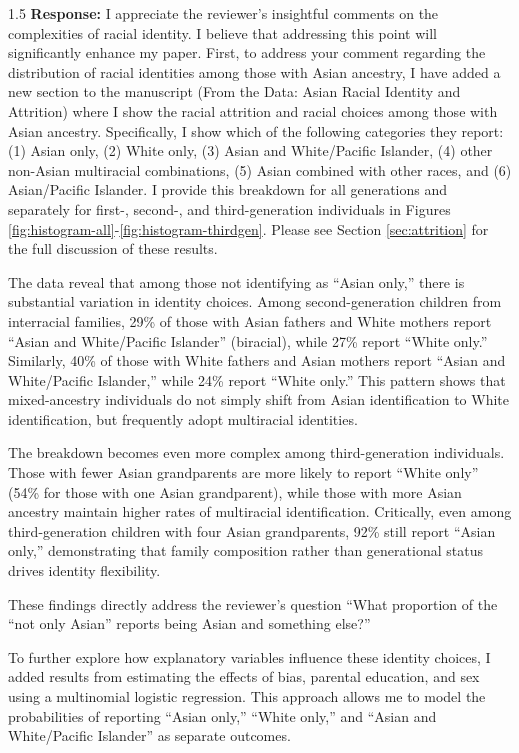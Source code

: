 \documentclass[12pt,english]{article}
\newcommand{\rrxspc}{1.5}
\begin{document}
\begin{refsection}
        \begin{spacing}{\rrxspc}
            \textbf{Response:} I appreciate the reviewer's insightful comments on the complexities of racial identity. I believe that addressing this point will significantly enhance my paper. First, to address your comment regarding the distribution of racial identities among those with Asian ancestry, I have added a new section to the manuscript (From the Data: Asian Racial Identity and Attrition) where I show the racial attrition and racial choices among those with Asian ancestry. Specifically, I show which of the following categories they report: (1) Asian only, (2) White only, (3) Asian and White/Pacific Islander, (4) other non-Asian multiracial combinations, (5) Asian combined with other races, and (6) Asian/Pacific Islander. I provide this breakdown for all generations and separately for first-, second-, and third-generation individuals in Figures \ref{fig:histogram-all}-\ref{fig:histogram-thirdgen}. Please see Section \ref{sec:attrition} for the full discussion of these results. 

            The data reveal that among those not identifying as ``Asian only,'' there is substantial variation in identity choices. Among second-generation children from interracial families, 29\% of those with Asian fathers and White mothers report ``Asian and White/Pacific Islander'' (biracial), while 27\% report ``White only.'' Similarly, 40\% of those with White fathers and Asian mothers report ``Asian and White/Pacific Islander,'' while 24\% report ``White only.'' This pattern shows that mixed-ancestry individuals do not simply shift from Asian identification to White identification, but frequently adopt multiracial identities.

            The breakdown becomes even more complex among third-generation individuals. Those with fewer Asian grandparents are more likely to report ``White only'' (54\% for those with one Asian grandparent), while those with more Asian ancestry maintain higher rates of multiracial identification. Critically, even among third-generation children with four Asian grandparents, 92\% still report ``Asian only,'' demonstrating that family composition rather than generational status drives identity flexibility.

            These findings directly address the reviewer's question ``What proportion of the “not only Asian” reports being Asian and something else?'' 

            To further explore how explanatory variables influence these identity choices, I added results from estimating the effects of bias, parental education, and sex using a multinomial logistic regression. This approach allows me to model the probabilities of reporting ``Asian only,'' ``White only,'' and ``Asian and White/Pacific Islander'' as separate outcomes. 
            

\end{spacing}
\end{refsection}
\end{document}
